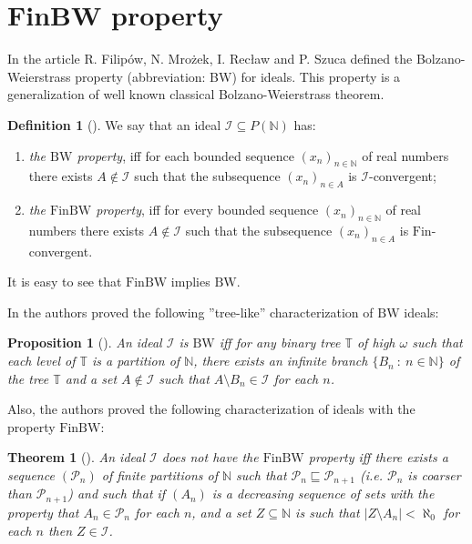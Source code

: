 \documentclass{amsart}
\newtheorem{thm}{Theorem}
\newtheorem{prop}{Proposition}
\theoremstyle{definition}
\newtheorem{df}{Definition}
\theoremstyle{definition}
\newcommand{\N}{{\mathbb N}}
\newcommand{\Fin}{\textrm{Fin}}
\newcommand{\I}{\mathcal I}
\newcommand{\bw}{\text{BW}}
\newcommand{\finbw}{\text{FinBW}}
\begin{document}

\color{black}
\section{FinBW property}

In the article \cite{H1} R. Filipów, N. Mrożek, I. Recław and P. Szuca 
defined the Bolzano-Weierstrass property (abbreviation: BW) 
for ideals. This property is a generalization
of well known classical Bolzano-Weierstrass theorem.

\begin{df}[\cite{H1}]
We say that an ideal $\I \subseteq P(\N)$ has:
\begin{enumerate}
\item \emph{the $\bw$ property}, 
iff for each bounded sequence $(x_n)_{n\in\N}$ 
of real numbers there exists $A\notin\I$ 
such that the subsequence $(x_n)_{n\in A}$ is $\I$-convergent;
\item \emph{the $\finbw$ property}, iff for every bounded sequence
$(x_n)_{n\in\N}$ of real numbers there exists $A\notin\I$ 
such that the subsequence $(x_n)_{n\in A}$ is $\Fin$-convergent.
\end{enumerate}
\end{df}
It is easy to see that $\finbw$ implies $\bw$.

In \cite{H1} the authors proved the following ''tree-like'' 
characterization of $\bw$ ideals:
\begin{prop}[\cite{H1}]
An ideal $\I$ is $\bw$ iff for any binary tree $\mathbb{T}$ of high $\omega$ 
such that each level of $\mathbb{T}$ is a partition of $\N$, 
there exists an infinite branch $\{B_n \ :\ n\in \N\}$ of the tree
$\mathbb{T}$ and a set $A\notin\I$ such that $A\setminus B_n \in\I$ for each $n$.
\end{prop}

Also, the authors \cite{BFMS11} proved 
the following characterization of ideals with the property $\finbw$:
\begin{thm}[\cite{BFMS11}]
\label{tree-fin-bw}
An ideal $\I$ does not have the $\finbw$ property iff there exists a 
sequence $(\mathcal{P}_n)$ of finite partitions of $\N$ such that 
$\mathcal{P}_n \sqsubseteq \mathcal{P}_{n + 1}$
(i.e. $\mathcal{P}_n$ is coarser than $\mathcal{P}_{n + 1}$)
and such that if $(A_n)$ is a decreasing sequence 
of sets with the property that $A_n \in \mathcal{P}_n$ for each $n$, 
and a set $Z\subseteq\N$ is such that $|Z\setminus A_n| < \aleph_0$ 
for each $n$ then $Z\in\I$.
\end{thm}
\end{document}
